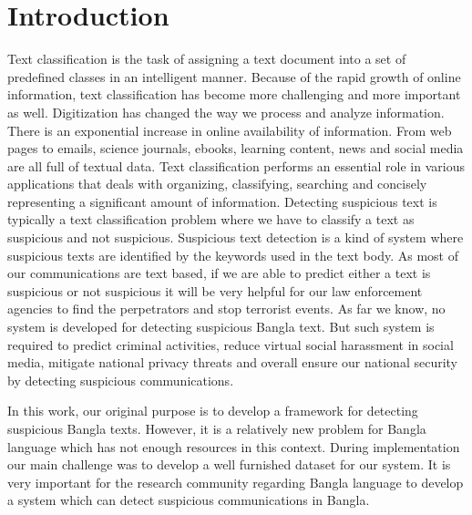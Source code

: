 \section{\textbf{Introduction}}
Text classification is the task of assigning a text document into a set of predefined classes in an intelligent manner. Because of the rapid growth of online information, text classification has become more challenging and more important as well. Digitization has changed
the way we process and analyze information. There is an exponential increase in online availability of information. From web pages to emails, science journals, ebooks, learning content, news and social media are all full of textual data. Text classification performs an essential role in various applications that deals with organizing, classifying, searching and concisely representing a significant amount of information. Detecting suspicious text is typically a text classification problem where we have to classify a text as suspicious and not suspicious. Suspicious text detection is a kind of system where suspicious texts are identified by the keywords used in the text body. As most of our communications are text based, if we are able to predict either a text is suspicious or not suspicious it will be very helpful for our law enforcement agencies to find the perpetrators and stop terrorist events. As far we know, no system is developed for detecting suspicious Bangla text. But such system is required to predict criminal activities, reduce virtual social harassment in social media, mitigate national privacy threats and overall ensure our national security by detecting suspicious communications. 

In this work, our original purpose is to develop a framework for detecting suspicious Bangla texts. However, it is a relatively new problem for Bangla language which has not enough resources in this context. During implementation our main challenge was to develop a well furnished dataset for our system. It is very important for the research community regarding Bangla language to develop a system which can detect suspicious communications in Bangla.